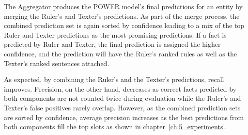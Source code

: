 The Aggregator produces the POWER model's final predictions for an entity by merging the Ruler's and Texter's
predictions.
As part of the merge process, the combined prediction set is again sorted by confidence leading to a mix of the top
Ruler and Texter predictions as the most promising predictions.
If a fact is predicted by Ruler and Texter, the final prediction is assigned the higher confidence, and the prediction
will have the Ruler's ranked rules as well as the Texter's ranked sentences attached.

As expected, by combining the Ruler's and the Texter's predictions, recall improves.
Precision, on the other hand, decreases as correct facts predicted by both components are not counted twice during
evaluation while the Ruler's and Texter's false positives rarely overlap.
However, as the combined prediction sets are sorted by confidence, average precision increases as the best predictions
from both components fill the top slots as shown in chapter~\ref{ch:5_experiments}.
